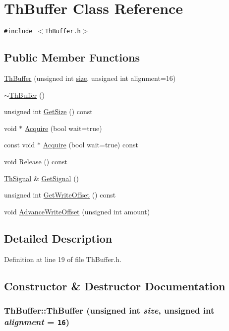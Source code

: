 \hypertarget{class_th_buffer}{
\section{ThBuffer Class Reference}
\label{class_th_buffer}
}
{\tt \#include $<$ThBuffer.h$>$}

\subsection*{Public Member Functions}
\begin{CompactItemize}
\item 
\hyperlink{class_th_buffer_13e63db8c011ff2ae0b1299d98d24b27}{ThBuffer} (unsigned int \hyperlink{glext__bak_8h_3d1e3edfcf61ca2d831883e1afbad89e}{size}, unsigned int alignment=16)
\item 
\hyperlink{class_th_buffer_be72d88fcd65dc1a38f235bf62cc9389}{$\sim$ThBuffer} ()
\item 
unsigned int \hyperlink{class_th_buffer_1db647c615af650675ecf0a3a696036b}{GetSize} () const 
\item 
void $\ast$ \hyperlink{class_th_buffer_1e98d61991e2ff9dc94dcea0e1381cfd}{Acquire} (bool wait=true)
\item 
const void $\ast$ \hyperlink{class_th_buffer_3120cde7f42cb70fe65d91a41692f772}{Acquire} (bool wait=true) const 
\item 
void \hyperlink{class_th_buffer_8d1ec8f6cb1060228d414106bb334754}{Release} () const 
\item 
\hyperlink{class_th_signal}{ThSignal} \& \hyperlink{class_th_buffer_c2bc5bbc82b316254435801fe9687644}{GetSignal} ()
\item 
unsigned int \hyperlink{class_th_buffer_bc6500a64a45ea7510dd490749fa67de}{GetWriteOffset} () const 
\item 
void \hyperlink{class_th_buffer_606930e690108540fafbb73857434aad}{AdvanceWriteOffset} (unsigned int amount)
\end{CompactItemize}


\subsection{Detailed Description}


Definition at line 19 of file ThBuffer.h.

\subsection{Constructor \& Destructor Documentation}
\hypertarget{class_th_buffer_13e63db8c011ff2ae0b1299d98d24b27}{
\subsubsection[{ThBuffer}]{\setlength{\rightskip}{0pt plus 5cm}ThBuffer::ThBuffer (unsigned int {\em size}, \/  unsigned int {\em alignment} = {\tt 16})}}
\label{class_th_buffer_13e63db8c011ff2ae0b1299d98d24b27}




